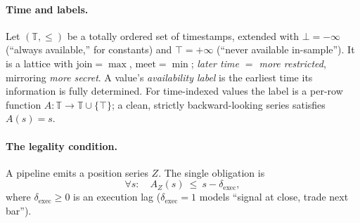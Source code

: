 \documentclass[11pt]{article}
\theoremstyle{plain}
\theoremstyle{definition}
\begin{document}
\paragraph{Time and labels.}
Let $(\mathbb{T},\le)$ be a totally ordered set of timestamps, extended with
$\bot=-\infty$ (``always available,'' for constants) and $\top=+\infty$ (``never
available in-sample''). It is a lattice with $\text{join}=\max$, $\text{meet}=\min$;
\emph{later time $=$ more restricted}, mirroring \emph{more secret}. A value's
\emph{availability label} is the earliest time its information is fully
determined. For time-indexed values the label is a per-row function
$A:\mathbb{T}\to\mathbb{T}\cup\{\top\}$; a clean, strictly backward-looking
series satisfies $A(s)=s$.

\paragraph{The legality condition.}
A pipeline emits a position series $Z$. The single obligation is
\[
\forall s:\quad A_Z(s)\ \le\ s-\delta_{\text{exec}},
\]
where $\delta_{\text{exec}}\ge 0$ is an execution lag ($\delta_{\text{exec}}=1$
models ``signal at close, trade next bar'').
\end{document}
